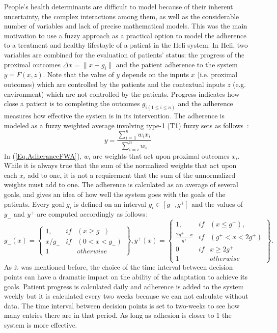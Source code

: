 \documentclass{llncs}
\begin{document}
People's health determinants are difficult to model because of their inherent uncertainty, the complex interactions among them, as well as the considerable number of variables and lack of precise mathematical models. This was the main motivation to use a fuzzy approach as a  practical option to model the adherence to a treatment and healthy lifestayle of a patient in the Heli system. In Heli, two variables are combined for the evaluation of patients' status: the progress of the proximal outcomes $\Delta x = \|x - g_i\|$  and the patient adherence to the system $y = F(x,z)$. Note that the value of $y$ depends on the inputs $x$ (i.e. proximal outcomes) which are controlled by the patients and the contextual inputs $z$ (e.g. environment) which are not controlled by the patients. Progress indicates how close a patient is to completing the outcomes $g_{i(1\leq i \leq n)}$ and the adherence measures how effective the system is in its intervention. The adherence is modeled as a fuzzy weighted average involving type-1 (T1) fuzzy sets as follows~\cite{Liu2008}:
\begin{equation}
y = \frac{\sum_{i=1}^n w_i x_i}{\sum_{i=i}^n w_i}
\label{Eq.AdheranceFWA}
\end{equation}
In (\ref{Eq.AdheranceFWA}), $w_i$ are weights that act upon proximal outcomes $x_i$. While it is always true that the sum of the normalized weights that act upon each $x_i$ add to one, it is not a requirement that the sum of the unnormalized weights must add to one. The adherence is calculated as an average of several goals, and gives an idea of how well the system goes with the goals of the patients. Every goal $g_i$ is defined on an interval $g_i \in [g_{-}, g^{+}]$ and the values of $y_{-}$ and $y^{+}$ are computed accordingly as follows:
\begin{equation}
 	y_{-}(x)= \left\{ 
	\begin{array}{lcr}
        1,	         & if &(x \geq g_{-})\\
        x/g_{-} 	 & if &(0<x<g_{-})\\
        1                & &otherwise
	\end{array}
	\right \},
 	y^{+}(x)= \left\{ 
	\begin{array}{lcr}
        1,	         & if &(x \leq g^{+}),\\
        \frac{2g^{+}- x}{g^{+} }	 & if &(g^{+}<x<2g^{+} )\\
        0                & if & x \geq 2g^{+}\\
        1                & & otherwise
	\end{array}
	\right \}.
\label{Eq.Adherance}
\end{equation}
As it was mentioned before, the choice of the time interval between decision points can have a dramatic impact on the ability of the adaptation to achieve its goals. Patient progress is calculated daily and adherence is added to the system weekly but it is calculated every two weeks because we can not calculate without data. The time interval between decision points is set to two-weeks to see how many entries there are in that period. As long as adhesion is closer to 1 the system is more effective.
\end{document}
